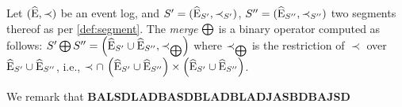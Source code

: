 \begin{newj}
\begin{definition}[Merge]\label{def:merge}
	Let $(\widehat{\mathrm{E}}, \prec)$ be an event log, and
	${S' = (\widehat{\mathrm{E}}_{S'}, \prec_{S'})}$,
	${S'' = (\widehat{\mathrm{E}}_{S''}, \prec_{S''})}$ two segments thereof as per \cref{def:segment}. 
	The \emph{merge} $\bigoplus$ is a binary operator computed as follows: 
	$S' \bigoplus S'' = \left(\widehat{\mathrm{E}}_{S'} \cup \widehat{\mathrm{E}}_{S''}, \prec_{\bigoplus} \right)$ 
	where 
	$\prec_{\bigoplus}$ is the restriction of $\prec$ over $\widehat{\mathrm{E}}_{S'} \cup \widehat{\mathrm{E}}_{S''}$, i.e.,  $\prec \cap\, \left(\widehat{\mathrm{E}}_{S'} \cup \widehat{\mathrm{E}}_{S''}\right) \times \left(\widehat{\mathrm{E}}_{S'} \cup \widehat{\mathrm{E}}_{S''}\right)$. 
\end{definition}
%
We remark that \textbf{BALSDLADBASDBLADBLADJASBDBAJSD}


\begin{comment}
def iid(event):
  bla bla bla
  
caseid = iid
hospitalcaseid = iid
treatmentid = iid

comesichiama = {"hospital" : "caseid", "pharma" : "hospitalcaseid", "clinic" : "treatmentid"}

comesichiama["hospital"](x)
\end{comment}
\begin{comment}
In light of the above, the log partition is a totally ordered set, too. In the example, \ldots\todo{Add example}
Let $\CIdU$ be a finite non-empty set of symbols such that $|\CIdU| \leqslant |\EvtU|$.

, and (blah) as above. The order-preserving union $\Merge: \EvtU^3 \times \EvtU^3 \to \EvtU^3$ of losets is computed as follows: $(\EvtU', \prec') \Merge (\EvtU'', \prec'') = \left(\EvtU' \cup \EvtU'', \prec \cap\, (\EvtU'\cup\EvtU'')^2\right)$.

    


\end{comment}
\end{newj}
